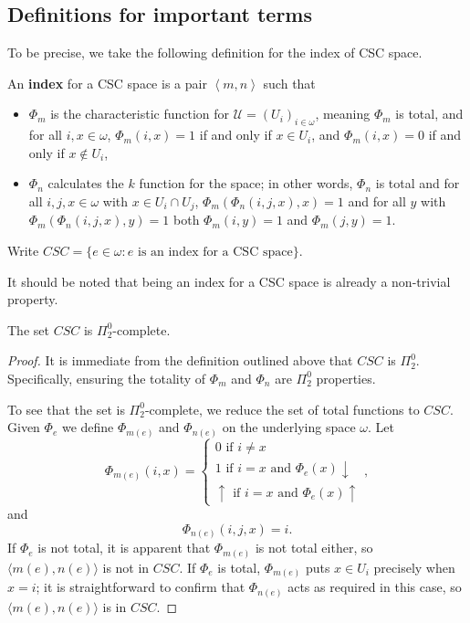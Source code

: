 \documentclass[11pt]{amsart}
\theoremstyle{remark}
\begin{document}
\subsection{Definitions for important terms}
To be precise, we take the following definition for the index of CSC space.
\begin{definition}
    An \textbf{index} for a CSC space is a pair $\left\langle m, n \right\rangle$ such that
    \begin{itemize}
        \item $\Phi_m$ is the characteristic function for $\mathcal{U} = (U_i)_{i \in \omega}$, meaning $\Phi_m$ is total, and for all $i, x \in \omega$, $\Phi_m(i, x) = 1$ if and only if $x \in U_i$, and $\Phi_m(i, x) = 0$ if and only if $x \notin U_i$,
        \item $\Phi_n$ calculates the $k$ function for the space; in other words, $\Phi_n$ is total and for all $i,j,x\in\omega$ with $x\in U_i\cap U_j$, $\Phi_m(\Phi_n( i,j,x),x)=1$ and for all $y$ with $\Phi_m(\Phi_n(i,j,x),y)=1$ both $\Phi_m(i,y)=1$ and $\Phi_m(j,y)=1$.
    \end{itemize}

    Write $CSC = \{e \in \omega : \text{$e$ is an index for a CSC space}\}$.
\end{definition}

It should be noted that being an index for a CSC space is already a non-trivial property.
\begin{theorem}
    The set $CSC$ is $\Pi^0_2$-complete.
\end{theorem}

\begin{proof}
    It is immediate from the definition outlined above that $CSC$ is $\Pi^0_2$.
    Specifically, ensuring the totality of $\Phi_m$ and $\Phi_n$ are $\Pi^0_2$ properties.

    To see that the set is $\Pi^0_2$-complete, we reduce the set of total functions to $CSC$.
    Given $\Phi_e$ we define $\Phi_{m(e)}$ and $\Phi_{n(e)}$ on the underlying space $\omega$.
    Let
    \[\Phi_{m(e)}(i,x)=
    \begin{cases}
        0 \text{ if } i\neq x \\
        1 \text{ if } i=x \text{ and } \Phi_e(x)\downarrow \\
        \uparrow \text{ if } i=x \text{ and } \Phi_e(x)\uparrow
    \end{cases},\]
    and
    \[ \Phi_{n(e)}(i,j,x)=i.\]
    If $\Phi_e$ is not total, it is apparent that $\Phi_{m(e)}$ is not total either, so $\langle m(e),n(e)\rangle$ is not in $CSC$.
    If $\Phi_e$ is total, $\Phi_{m(e)}$ puts $x\in U_i$ precisely when $x=i$; it is straightforward to confirm that $\Phi_{n(e)}$ acts as required in this case, so $\langle m(e),n(e)\rangle$ is in $CSC$.
\end{proof}
\end{document}
